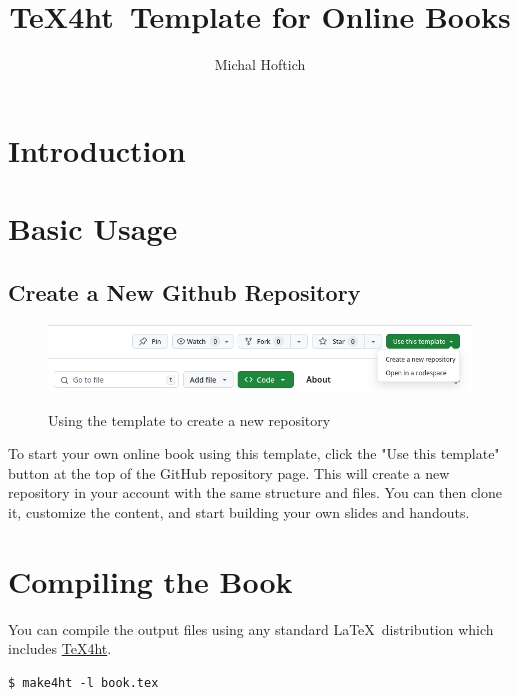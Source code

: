\documentclass{book}
\begin{document}
\title{\TeX4ht\ Template for Online Books}
\author{Michal Hoftich}
\maketitle
\tableofcontents

\chapter{Introduction}



\chapter{Basic Usage}

\section{Create a New Github Repository}

\begin{figure}[htbp]
  \includegraphics[width=\textwidth,alt={Image of button for use of this repository as a template}]{img/template-use.png}
\caption{Using the template to create a new repository}
\end{figure}

To start your own online book using this template, click the "Use this
template" button at the top of the GitHub repository page. This will create a
new repository in your account with the same structure and files. You can then
clone it, customize the content, and start building your own slides and
handouts.






\chapter{Compiling the Book}


You can compile the output files using any standard \LaTeX\ distribution which includes \href{https://www.tug.org/tex4ht/}{\TeX4ht}.

\begin{verbatim}
$ make4ht -l book.tex    
\end{verbatim}
\end{document}

